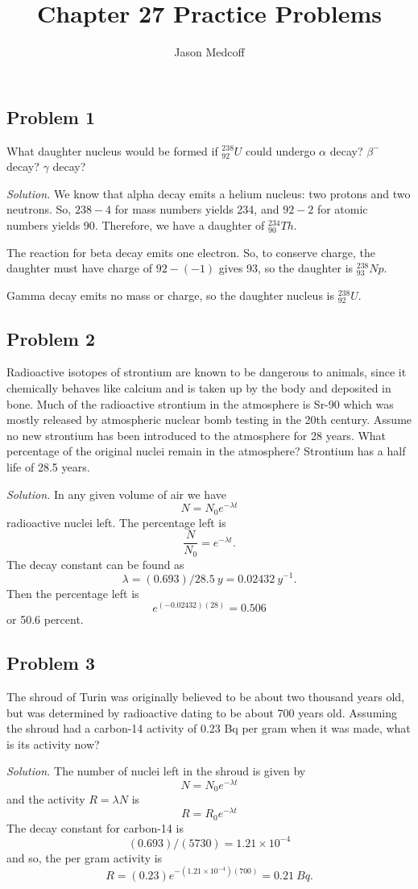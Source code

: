 \documentclass{article}
\title{Chapter 27 Practice Problems}
\author{Jason Medcoff}
\date{}
\begin{document}
	\maketitle
	
	\subsection{Problem 1}
	What daughter nucleus would be formed if $^{238}_{92} U$ could undergo $\alpha$ decay? $\beta^-$ decay? $\gamma$ decay?
	
	\textit{Solution.}
	We know that alpha decay emits a helium nucleus: two protons and two neutrons. So, $238 - 4$ for mass numbers yields 234, and $92 - 2$ for atomic numbers yields 90. Therefore, we have a daughter of $^{234}_{90} Th$.
	
	The reaction for beta decay emits one electron. So, to conserve charge, the daughter must have charge of $92 - (-1)$ gives 93, so the daughter is $^{238}_{93} Np$.
	
	Gamma decay emits no mass or charge, so the daughter nucleus is $^{238}_{92} U$.
	
	
	\subsection{Problem 2}
	Radioactive isotopes of strontium are known to be dangerous to animals, since it chemically behaves like calcium and is taken up by the body and deposited in bone. Much of the radioactive strontium in the atmosphere is Sr-90 which was mostly released by atmospheric nuclear bomb testing in the 20th century. Assume no new strontium has been introduced to the atmosphere for 28 years. What percentage of the original nuclei remain in the atmosphere? Strontium has a half life of 28.5 years.
	
	\textit{Solution.}
	In any given volume of air we have
	$$ N = N_0 e^{-\lambda t} $$
	radioactive nuclei left. The percentage left is
	$$ \frac{N}{N_0} = e^{-\lambda t} . $$
	The decay constant can be found as
	$$ \lambda = (0.693)/28.5 \ y = 0.02432 \ y^{-1} . $$
	Then the percentage left is
	$$ e^{(-0.02432)(28)} = 0.506 $$
	or 50.6 percent.
	
	
	\subsection{Problem 3}
	The shroud of Turin was originally believed to be about two thousand years old, but was determined by radioactive dating to be about 700 years old. Assuming the shroud had a carbon-14 activity of 0.23 Bq per gram when it was made, what is its activity now?
	
	\textit{Solution.}
	The number of nuclei left in the shroud is given by
	$$ N = N_0 e^{-\lambda t} $$
	and the activity $R = \lambda N$ is
	$$ R = R_0 e^{-\lambda t} $$
	The decay constant for carbon-14 is
	$$ (0.693)/(5730) = 1.21 \times 10^{-4} $$
	and so, the per gram activity is
	$$ R = (0.23) e^{-(1.21\times 10^{-4})(700)} = 0.21 \ Bq . $$
	
	
	
	
	
	
	
	
\end{document}
